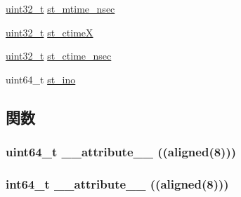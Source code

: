 \begin{DoxyCompactItemize}
\item 
\hyperlink{Type_8hh_a435d1572bf3f880d55459d9805097f62}{uint32\_\-t} \hyperlink{structArmLinux32_1_1tgt__stat64_a9ed67078a73668c2a571e8dffab663dd}{st\_\-mtime\_\-nsec}
\item 
\hyperlink{Type_8hh_a435d1572bf3f880d55459d9805097f62}{uint32\_\-t} \hyperlink{structArmLinux32_1_1tgt__stat64_a71b091cf2bb1cd800dcf01432d847278}{st\_\-ctimeX}
\item 
\hyperlink{Type_8hh_a435d1572bf3f880d55459d9805097f62}{uint32\_\-t} \hyperlink{structArmLinux32_1_1tgt__stat64_a6fd226278201931c263816b5962904f5}{st\_\-ctime\_\-nsec}
\item 
uint64\_\-t \hyperlink{structArmLinux32_1_1tgt__stat64_abb54f0e7d91659ba9f4ab77a5392c08a}{st\_\-ino}
\end{DoxyCompactItemize}


\subsection{関数}
\hypertarget{structArmLinux32_1_1tgt__stat64_a3c6566c109586774cfae18e3b746a652}{
\subsubsection[{\_\-\_\-attribute\_\-\_\-}]{\setlength{\rightskip}{0pt plus 5cm}uint64\_\-t \_\-\_\-attribute\_\-\_\- ((aligned(8)))}}
\label{structArmLinux32_1_1tgt__stat64_a3c6566c109586774cfae18e3b746a652}
\hypertarget{structArmLinux32_1_1tgt__stat64_a5dd8bcdc45cdf7b01dfcbcfad5d3bd52}{
\subsubsection[{\_\-\_\-attribute\_\-\_\-}]{\setlength{\rightskip}{0pt plus 5cm}int64\_\-t \_\-\_\-attribute\_\-\_\- ((aligned(8)))}}
\label{structArmLinux32_1_1tgt__stat64_a5dd8bcdc45cdf7b01dfcbcfad5d3bd52}



